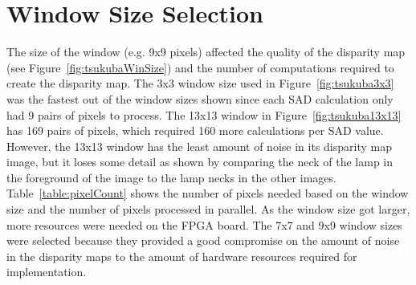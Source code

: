 \section{Window Size Selection}
\label{sec:windowSize}

The size of the window (e.g. 9x9 pixels) affected the quality of the disparity map (see Figure~\ref{fig:tsukubaWinSize}) and the number of computations required to create the disparity map. The 3x3 window size used in Figure~\ref{fig:tsukuba3x3} was the fastest out of the window sizes shown since each SAD calculation only had 9 pairs of pixels to process. The 13x13 window in Figure~\ref{fig:tsukuba13x13} has 169 pairs of pixels, which required 160 more calculations per SAD value. However, the 13x13 window has the least amount of noise in its disparity map image, but it loses some detail as shown by comparing the neck of the lamp in the foreground of the image to the lamp necks in the other images. Table~\ref{table:pixelCount} shows the number of pixels needed based on the window size and the number of pixels processed in parallel. As the window size got larger, more resources were needed on the FPGA board. The 7x7 and 9x9 window sizes were selected because they provided a good compromise on the amount of noise in the disparity maps to the amount of hardware resources required for implementation.

